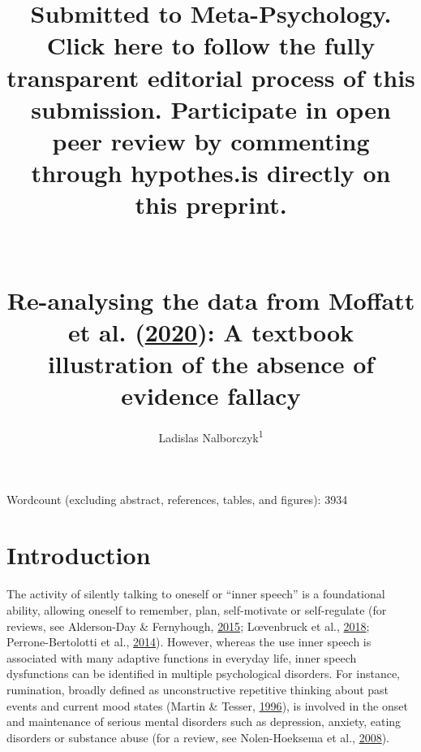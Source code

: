 \documentclass[
  english,
  man, donotrepeattitle,floatsintext]{apa6}
\author{Ladislas Nalborczyk\textsuperscript{1}}
\affiliation{
\vspace{0.5cm}
\textsuperscript{1} Univ. Grenoble Alpes, CNRS, Grenoble INP, GIPSA-lab, 38000 Grenoble, France}
\title{\textbf{Submitted to Meta-Psychology. Click here to follow the fully transparent editorial process of this submission. Participate in open peer review by commenting through hypothes.is directly on this preprint.}\\
~\\
~\\
Re-analysing the data from Moffatt et al. (\protect\hyperlink{ref-moffatt_inner_2020}{2020}): A textbook illustration of the absence of evidence fallacy}
\date{}
\begin{document}
\maketitle

Wordcount (excluding abstract, references, tables, and figures): 3934

\newpage

\hypertarget{introduction}{%
\section{Introduction}\label{introduction}}

The activity of silently talking to oneself or ``inner speech'' is a foundational ability, allowing oneself to remember, plan, self-motivate or self-regulate (for reviews, see Alderson-Day \& Fernyhough, \protect\hyperlink{ref-alderson-day_inner_2015}{2015}; Lœvenbruck et al., \protect\hyperlink{ref-loevenbruck_cognitive_2018}{2018}; Perrone-Bertolotti et al., \protect\hyperlink{ref-perrone-bertolotti_what_2014}{2014}). However, whereas the use inner speech is associated with many adaptive functions in everyday life, inner speech dysfunctions can be identified in multiple psychological disorders. For instance, rumination, broadly defined as unconstructive repetitive thinking about past events and current mood states (Martin \& Tesser, \protect\hyperlink{ref-Martin}{1996}), is involved in the onset and maintenance of serious mental disorders such as depression, anxiety, eating disorders or substance abuse (for a review, see Nolen-Hoeksema et al., \protect\hyperlink{ref-Nolen-Hoeksema2008}{2008}).
\end{document}
